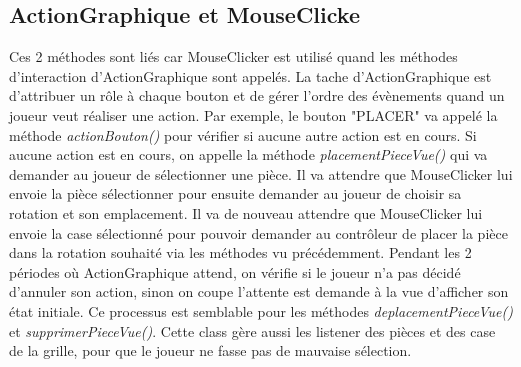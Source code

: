         \subsection{ActionGraphique et MouseClicke}
        Ces 2 méthodes sont liés car MouseClicker est utilisé quand les méthodes d'interaction d'ActionGraphique sont appelés. La tache d'ActionGraphique est d'attribuer un rôle à chaque bouton et de gérer l'ordre des évènements quand un joueur veut réaliser une action. Par exemple, le bouton "PLACER" va appelé la méthode \textit{actionBouton()} pour vérifier si aucune autre action est en cours. Si aucune action est en cours, on appelle la méthode \textit{placementPieceVue()} qui va demander au joueur de sélectionner une pièce. Il va attendre que MouseClicker lui envoie la pièce sélectionner pour ensuite demander au joueur de choisir sa rotation et son emplacement. Il va de nouveau attendre que MouseClicker lui envoie la case sélectionné pour pouvoir demander au contrôleur de placer la pièce dans la rotation souhaité via les méthodes vu précédemment. Pendant les 2 périodes où ActionGraphique attend, on vérifie si le joueur n'a pas décidé d'annuler son action, sinon on coupe l'attente est demande à la vue d'afficher son état initiale. Ce processus est semblable pour les méthodes \textit{deplacementPieceVue()} et \textit{supprimerPieceVue()}. Cette class gère aussi les listener des pièces et des case de la grille, pour que le joueur ne fasse pas de mauvaise sélection.
